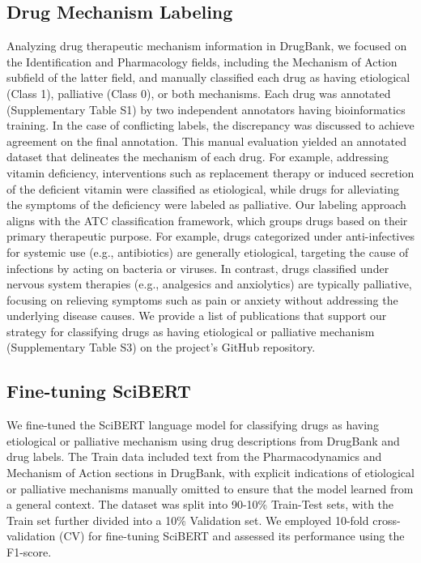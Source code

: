 \documentclass[journal,twoside,web]{ieeecolor}
\begin{document}
\subsection{Drug Mechanism Labeling}
\label{sec:annotation}
Analyzing drug therapeutic mechanism information in DrugBank, we focused on the Identification and Pharmacology fields, including the Mechanism of Action subfield of the latter field, and manually classified each drug as having etiological (Class 1), palliative (Class 0), or both mechanisms. 
Each drug was annotated (Supplementary Table S1) by two independent annotators having bioinformatics training. 
In the case of conflicting labels, the discrepancy was discussed to achieve agreement on the final annotation.
This manual evaluation yielded an annotated dataset that delineates the mechanism of each drug.
For example, addressing vitamin deficiency, interventions such as replacement therapy or induced secretion of the deficient vitamin were classified as etiological, while drugs for alleviating the symptoms of the deficiency were labeled as palliative.
Our labeling approach aligns with the ATC classification framework, which groups drugs based on their primary therapeutic purpose. For example, drugs categorized under anti-infectives for systemic use (e.g., antibiotics) are generally etiological, targeting the cause of infections by acting on bacteria or viruses. In contrast, drugs classified under nervous system therapies (e.g., analgesics and anxiolytics) are typically palliative, focusing on relieving symptoms such as pain or anxiety without addressing the underlying disease causes.
We provide a list of publications that support our strategy for classifying drugs as having etiological or palliative mechanism (Supplementary Table S3) on the project’s GitHub repository.

\subsection{Fine-tuning SciBERT}
\label{sec:SciBERT}
We fine-tuned the SciBERT language model \cite{beltagy2019scibert} for classifying drugs as having etiological or palliative mechanism using drug descriptions from DrugBank and drug labels.
The Train data included text from the Pharmacodynamics and Mechanism of Action sections in DrugBank, with explicit indications of etiological or palliative mechanisms manually omitted to ensure that the model learned from a general context. 
The dataset was split into 90-10\% Train-Test sets, with the Train set further divided into a 10\% Validation set. 
We employed 10-fold cross-validation (CV) for fine-tuning SciBERT and assessed its performance using the F1-score.
\end{document}
